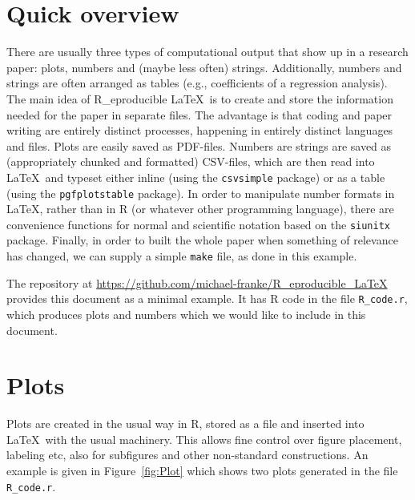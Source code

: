 \documentclass[fleqn,reqno,10pt]{article}
\begin{document}
\section*{Quick overview}

There are usually three types of computational output that show up in a research paper: plots,
numbers and (maybe less often) strings. Additionally, numbers and strings are often arranged as
tables (e.g., coefficients of a regression analysis). The main idea of R\_eproducible \LaTeX\
is to create and store the information needed for the paper in separate files. The advantage is
that coding and paper writing are entirely distinct processes, happening in entirely distinct
languages and files. Plots are easily saved as PDF-files. Numbers are strings are saved as
(appropriately chunked and formatted) CSV-files, which are then read into \LaTeX\ and typeset
either inline (using the \texttt{csvsimple} package) or as a table (using the
\texttt{pgfplotstable} package). In order to manipulate number formats in \LaTeX, rather than
in R (or whatever other programming language), there are convenience functions for normal and
scientific notation based on the \texttt{siunitx} package. Finally, in order to built the whole
paper when something of relevance has changed, we can supply a simple \texttt{make} file, as
done in this example.

The repository at \url{https://github.com/michael-franke/R_eproducible_LaTeX} provides this
document as a minimal example. It has R code in the file \texttt{R\_code.r}, which produces
plots and numbers which we would like to include in this document.

\section*{Plots}

Plots are created in the usual way in R, stored as a file and inserted into \LaTeX\ with the
usual machinery. This allows fine control over figure placement, labeling etc, also for
subfigures and other non-standard constructions. An example is given in Figure~\ref{fig:Plot}
which shows two plots generated in the file \verb|R_code.r|.
\end{document}
